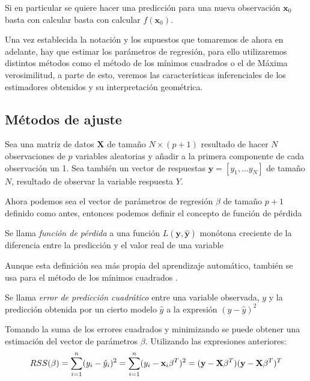 \noindent Si en particular se quiere hacer una predicción para una nueva observación  $\mathbf{x}_0$ basta con calcular basta con calcular $f(\textbf{x}_0).$

\noindent Una vez establecida la notación y los supuestos que tomaremos de ahora en adelante, hay que estimar los parámetros de regresión, para ello utilizaremos distintos métodos como el método de los mínimos cuadrados o el de Máxima verosimilitud, a parte de esto, veremos las características inferenciales de los estimadores obtenidos y su interpretación geométrica. 

\subsection{Métodos de ajuste}
\noindent Sea una matriz de datos $\textbf{X}$ de tamaño $N\times (p+1)$ resultado de hacer $N$ observaciones de $p$ variables aleatorias y añadir a la primera componente de cada observación un 1. Sea también un vector de respuestas $\textbf{y}=[y_1,\ldots y_N]$ de tamaño $N$, resultado de observar la variable respuesta $Y$. 

\noindent Ahora podemos sea el vector de parámetros de regresión $\beta$ de tamaño $p+1$ definido como antes, entonces podemos definir el concepto de función de pérdida

\begin{defi}
Se llama \emph{función de pérdida} \cite{Hastie 2001} a una función $L(\textbf{y},\mathbf{\hat{y}})$ monótona creciente de la diferencia entre la predicción y el valor real de una variable
\end{defi}

\noindent Aunque esta definición sea más propia del aprendizaje automático, también se usa para el método de los mínimos cuadrados \cite{Abdi 2007}. 

\begin{defi}
Se llama \emph{error de predicción cuadrático} entre una variable observada, $y$ y la predicción obtenida por un cierto modelo $\hat{y}$ a la expresión $(y-\hat{y})^2$
\end{defi}

\noindent Tomando la suma de los errores cuadrados y minimizando se puede obtener una estimación  del vector de parámetros $\beta$. Utilizando las expresiones anteriores:
\begin{equation}
RSS(\beta)=\sum_{i=1}^n(y_i-\hat{y}_i)^2 = \sum_{i=1}^n(y_i-\textbf{x}_i\beta^T)^2=(\textbf{y}-\textbf{X}\beta^T)(\textbf{y}-\textbf{X}\beta^T)^T\\
\end{equation}

